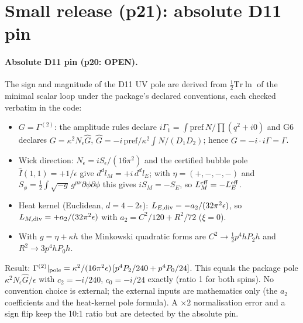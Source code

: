 \section{Small release (p21): absolute D11 pin}

\paragraph{Absolute D11 pin (p20: OPEN).} The sign and magnitude of the D11 UV pole are derived from
$\tfrac12\mathrm{Tr}\ln$ of the minimal scalar loop under the package's declared conventions, each checked verbatim
in the code:
\begin{itemize}
\item $G=\Gamma^{(2)}$: the amplitude rules declare $i\Gamma_1=\int\mathrm{pref}\,N/\prod(q^2+i0)$ and G6 declares
  $G=\kappa^2N_\epsilon\hat G$, $\hat G=-i\,\mathrm{pref}/\kappa^2\int N/(D_1D_2)$; hence $G=-i\cdot i\Gamma=\Gamma$.
\item Wick direction: $N_\epsilon=iS_\epsilon/(16\pi^2)$ and the certified bubble pole $\hat I(1,1)=+1/\epsilon$ give
  $d^dl_M=+i\,d^dl_E$; with $\eta=(+,-,-,-)$ and $S_\phi=\tfrac12\int\sqrt{-g}\,g^{\mu\nu}\partial\phi\partial\phi$
  this gives $iS_M=-S_E$, so $L^{\rm eff}_M=-L^{\rm eff}_E$.
\item Heat kernel (Euclidean, $d=4-2\epsilon$): $L_{E,\rm div}=-a_2/(32\pi^2\epsilon)$, so
  $L_{M,\rm div}=+a_2/(32\pi^2\epsilon)$ with $a_2=C^2/120+R^2/72$ ($\xi=0$).
\item With $g=\eta+\kappa h$ the Minkowski quadratic forms are $C^2\to\tfrac12p^4hP_2h$ and $R^2\to3p^4hP_0h$.
\end{itemize}
Result: $\Gamma^{(2)}|_{\rm pole}=\kappa^2/(16\pi^2\epsilon)\,[p^4P_2/240+p^4P_0/24]$. This equals the package pole
$\kappa^2N_\epsilon\hat G/\epsilon$ with $c_2=-i/240$, $c_0=-i/24$ exactly (ratio 1 for both spins). No convention
choice is external; the external inputs are mathematics only (the $a_2$ coefficients and the heat-kernel pole
formula). A $\times2$ normalisation error and a sign flip keep the 10:1 ratio but are detected by the absolute pin.

